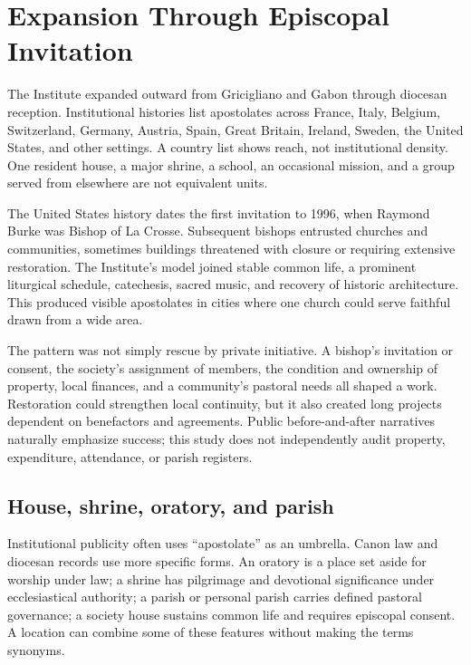 \section{Expansion Through Episcopal Invitation}

The Institute expanded outward from Gricigliano and Gabon through diocesan reception. Institutional histories list apostolates across France, Italy, Belgium, Switzerland, Germany, Austria, Spain, Great Britain, Ireland, Sweden, the United States, and other settings. A country list shows reach, not institutional density. One resident house, a major shrine, a school, an occasional mission, and a group served from elsewhere are not equivalent units.

The United States history dates the first invitation to 1996, when Raymond Burke was Bishop of La Crosse. Subsequent bishops entrusted churches and communities, sometimes buildings threatened with closure or requiring extensive restoration. The Institute's model joined stable common life, a prominent liturgical schedule, catechesis, sacred music, and recovery of historic architecture. This produced visible apostolates in cities where one church could serve faithful drawn from a wide area.

The pattern was not simply rescue by private initiative. A bishop's invitation or consent, the society's assignment of members, the condition and ownership of property, local finances, and a community's pastoral needs all shaped a work. Restoration could strengthen local continuity, but it also created long projects dependent on benefactors and agreements. Public before-and-after narratives naturally emphasize success; this study does not independently audit property, expenditure, attendance, or parish registers.

\subsection{House, shrine, oratory, and parish}

Institutional publicity often uses ``apostolate'' as an umbrella. Canon law and diocesan records use more specific forms. An oratory is a place set aside for worship under law; a shrine has pilgrimage and devotional significance under ecclesiastical authority; a parish or personal parish carries defined pastoral governance; a society house sustains common life and requires episcopal consent. A location can combine some of these features without making the terms synonyms.

